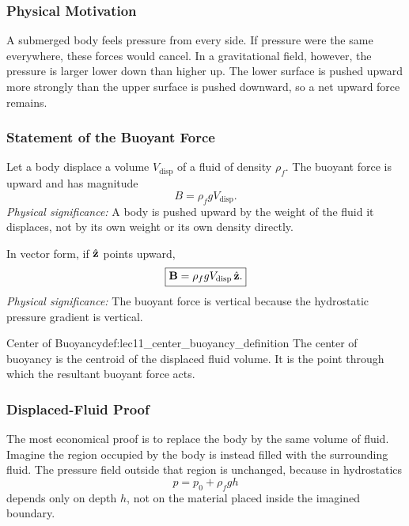 \documentclass[../main.tex]{subfiles}
\begin{document}
\subsubsection*{Physical Motivation}
A submerged body feels pressure from every side. If pressure were the same everywhere, these forces would cancel. In a gravitational field, however, the pressure is larger lower down than higher up. The lower surface is pushed upward more strongly than the upper surface is pushed downward, so a net upward force remains.

\subsubsection{Statement of the Buoyant Force}\label{subsec:lec11:buoyant-force}
Let a body displace a volume $V_{\mathrm{disp}}$ of a fluid of density $\rho_f$. The buoyant force is upward and has magnitude
\begin{equation}
  \boxed{B=\rho_f g V_{\mathrm{disp}}.}
  \label{eq:lec11_archimedes_magnitude}
\end{equation}
\textit{Physical significance:} A body is pushed upward by the weight of the fluid it displaces, not by its own weight or its own density directly.

In vector form, if $\hat{\mathbf{z}}$ points upward,
\begin{equation}
  \boxed{\mathbf{B}=\rho_f g V_{\mathrm{disp}}\,\hat{\mathbf{z}}.}
  \label{eq:lec11_archimedes_vector}
\end{equation}
\textit{Physical significance:} The buoyant force is vertical because the hydrostatic pressure gradient is vertical.

\begin{Definition}{Center of Buoyancy}{def:lec11_center_buoyancy_definition}
The center of buoyancy is the centroid of the displaced fluid volume. It is the point through which the resultant buoyant force acts.
\end{Definition}

\subsubsection{Displaced-Fluid Proof}\label{subsec:lec11:displaced-fluid-proof}
The most economical proof is to replace the body by the same volume of fluid. Imagine the region occupied by the body is instead filled with the surrounding fluid. The pressure field outside that region is unchanged, because in hydrostatics
\begin{equation}
  p=p_0+\rho_f gh
  \label{eq:lec11_pressure_depends_depth}
\end{equation}
depends only on depth $h$, not on the material placed inside the imagined boundary.
\end{document}
